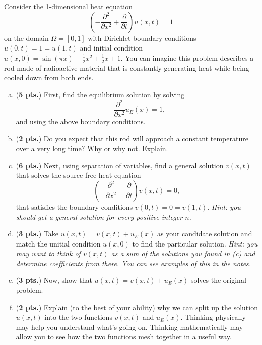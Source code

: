\documentclass[12pt]{amsbook}
\begin{document}
\newpage
\begin{problem}
Consider the 1-dimensional heat equation
\[
\left(-\frac{\partial^2}{\partial x^2} + \frac{\partial}{\partial t}\right)u(x,t) = 1
\]
on the domain $\Omega = [0,1]$ with Dirichlet boundary conditions $u(0,t)=1=u(1,t)$ and initial condition $u(x,0)=\sin(\pi x)-\frac{1}{2}x^2+\frac{1}{2}x+1$. You can imagine this problem describes a rod made of radioactive material that is constantly generating heat while being cooled down from both ends.
\vspace*{.5cm}
\begin{enumerate}[(a)]
    \item (\textbf{5 pts.}) First, find the equilibrium solution by solving
    \[
    -\frac{\partial^2}{\partial x^2} u_E(x) =1,
    \]
    and using the above boundary conditions.
    \vspace*{.5cm}
    \item (\textbf{2 pts.}) Do you expect that this rod will approach a constant temperature over a very long time? Why or why not. Explain.
    \vspace*{.5cm}
    \item (\textbf{6 pts.}) Next, using separation of variables, find a general solution $v(x,t)$ that solves the source free heat equation
    \[
    \left(-\frac{\partial^2}{\partial x^2} + \frac{\partial}{\partial t}\right)v(x,t) = 0,
    \]
    that satisfies the boundary conditions $v(0,t)=0=v(1,t)$. \emph{Hint: you should get a general solution for every positive integer $n$.}
    \vspace*{.5cm}
    \item (\textbf{3 pts.}) Take $u(x,t) = v(x,t) + u_E(x)$ as your candidate solution and match the unitial condition $u(x,0)$ to find the particular solution. \emph{Hint: you may want to think of $v(x,t)$ as a sum of the solutions you found in (c) and determine coefficients from there. You can see examples of this in the notes.}
    \vspace*{.5cm}
    
    \item (\textbf{3 pts.}) Now, show that $u(x,t)=v(x,t)+u_E(x)$ solves the original problem.
    \vspace*{.5cm}
    \item (\textbf{2 pts.}) Explain (to the best of your ability) why we can split up the solution $u(x,t)$ into the two functions $v(x,t)$ and $u_E(x)$. Thinking physically may help you understand what's going on.  Thinking mathematically may allow you to see how the two functions mesh together in a useful way.
\end{enumerate}
\end{problem}
\end{document}
